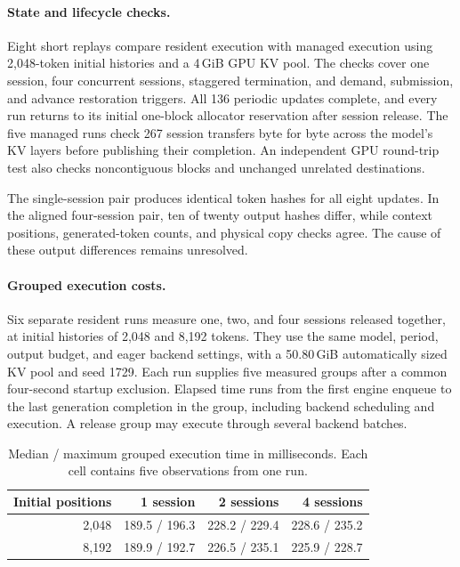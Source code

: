 \documentclass[sigplan,10pt,anonymous,review]{acmart}
\begin{document}
\paragraph{State and lifecycle checks.}
Eight short replays compare resident execution with managed execution using 2,048-token initial histories and a 4\,GiB GPU KV pool.
The checks cover one session, four concurrent sessions, staggered termination, and demand, submission, and advance restoration triggers.
All 136 periodic updates complete, and every run returns to its initial one-block allocator reservation after session release.
The five managed runs check 267 session transfers byte for byte across the model's KV layers before publishing their completion.
An independent GPU round-trip test also checks noncontiguous blocks and unchanged unrelated destinations.

The single-session pair produces identical token hashes for all eight updates.
In the aligned four-session pair, ten of twenty output hashes differ, while context positions, generated-token counts, and physical copy checks agree.
The cause of these output differences remains unresolved.

\paragraph{Grouped execution costs.}
Six separate resident runs measure one, two, and four sessions released together, at initial histories of 2,048 and 8,192 tokens.
They use the same model, period, output budget, and eager backend settings, with a 50.80\,GiB automatically sized KV pool and seed 1729.
Each run supplies five measured groups after a common four-second startup exclusion.
Elapsed time runs from the first engine enqueue to the last generation completion in the group, including backend scheduling and execution.
A release group may execute through several backend batches.

\begin{table}[t]
\centering
\caption{Median / maximum grouped execution time in milliseconds. Each cell contains five observations from one run.}
\label{tab:execution-costs}
\begin{tabular}{rrrr}
\toprule
Initial positions & 1 session & 2 sessions & 4 sessions \\
\midrule
2,048 & 189.5 / 196.3 & 228.2 / 229.4 & 228.6 / 235.2 \\
8,192 & 189.9 / 192.7 & 226.5 / 235.1 & 225.9 / 228.7 \\
\bottomrule
\end{tabular}
\end{table}
\end{document}
